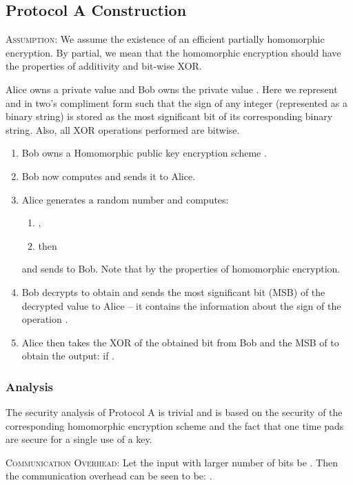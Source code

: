 \documentclass[11pt, letterpaper, romanappendices, onecolumn]{article}
\theoremstyle{plain}\newtheorem{thm}{Theorem}[section]
\theoremstyle{definition}
\theoremstyle{remark}
\begin{document}
\subsection{Protocol \textsf{A} Construction}
\textsc{Assumption:} We assume the existence of an efficient partially homomorphic encryption. By partial, we mean that the homomorphic encryption should have the properties of additivity and bit-wise XOR.

\par Alice owns a private value  and Bob owns the private value . Here we represent  and  in two's compliment form such that the sign of any integer (represented as a binary string) is stored as the most significant bit of its corresponding binary string. Also, all XOR operations performed are bitwise.

\begin{enumerate}
	\item Bob owns a Homomorphic public key encryption scheme .
	\item Bob now computes  and sends it to Alice.
	\item Alice generates a random number  and computes:
	\begin{enumerate}
		\item ,
		\item then 
	\end{enumerate}
	and sends  to Bob. Note that  by the properties of homomorphic encryption.
	\item Bob decrypts  to obtain  and sends the most significant bit (MSB) of the decrypted value to Alice -- it contains the information about the sign of the operation .
	\item Alice then takes the XOR of the obtained bit from Bob and the MSB of  to obtain the output: if .
\end{enumerate}

\subsubsection{Analysis}
\par The security analysis of Protocol \textsf{A} is trivial and is based on the security of the corresponding homomorphic encryption scheme and the fact that one time pads are secure for a single use of a key.

\par \textsc{Communication Overhead}: Let the input with larger number of bits be . Then the communication overhead can be seen to be: .
\end{document}
